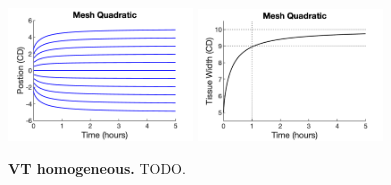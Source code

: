 \documentclass[12pt]{article}
\begin{document}
\begin{figure}[h]
%
\vspace{-0.5cm}
\begin{center}
\includegraphics[width=4.9cm, trim={0.0cm 0.0cm 0.0cm 0.0cm}, clip]{Figs/Test02aMonolayerGrowth1dChainHomogeneousChainMesh_Quadratic.png}
\includegraphics[width=4.9cm, trim={0.0cm 0.0cm 0.0cm 0.0cm}, clip]{Figs/Test02aMonolayerGrowth1dChainHomogeneousChainMesh_QuadraticWidth}
\end{center}
\vspace{-0.5cm}
\caption{{\bf VT homogeneous.} 
	TODO. }
\label{fig:todo}
\end{figure}
\end{document}
